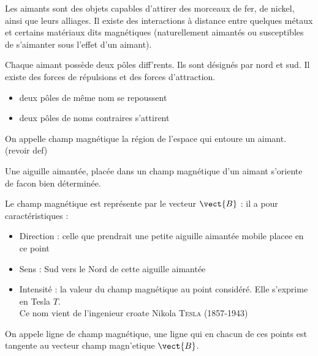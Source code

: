 
Les aimants sont des objets capables d'attirer des morceaux de fer, de nickel, ainsi que leurs alliages. Il existe des interactions \`a distance entre quelques m\'etaux et certains mat\'eriaux dits magn\'etiques (naturellement aimant\'es ou susceptibles de s'aimanter sous l'effet d'un aimant).



Chaque aimant poss\`ede deux p\^oles diff\e'rents. Ils sont d\'esign\'es par nord et sud. Il existe des forces de r\'epulsions et des forces d'attraction.

\begin{itemize}
\item deux p\^oles de m\^eme nom se repoussent
\item deux p\^oles de noms contraires s'attirent
\end{itemize}

On appelle champ magn\'etique la r\'egion de l'espace qui entoure un aimant.
(revoir def)

Une aiguille aimant\'ee, plac\'ee dans un champ magn\'etique d'un aimant s'oriente de facon bien d\'etermin\'ee.




Le champ magn\'etique est repr\'esente par le vecteur $\vect{B}$ : il a pour caract\'eristiques :

\begin{itemize}
\item Direction : celle que prendrait une petite aiguille aimant\'ee mobile placee en ce point
\item Sens : Sud vers le Nord de cette aiguille aimant\'ee
\item Intensit\'e : la valeur du champ magn\'etique au point consid\'er\'e. Elle s'exprime en Tesla $T$.\\
Ce nom vient de l'ingenieur croate Nikola \textsc{Tesla} (1857-1943)
\end{itemize}

On appele ligne de champ magn\'etique, une ligne qui en chacun de ces points est tangente au vecteur champ magn'etique $\vect{B}$.



